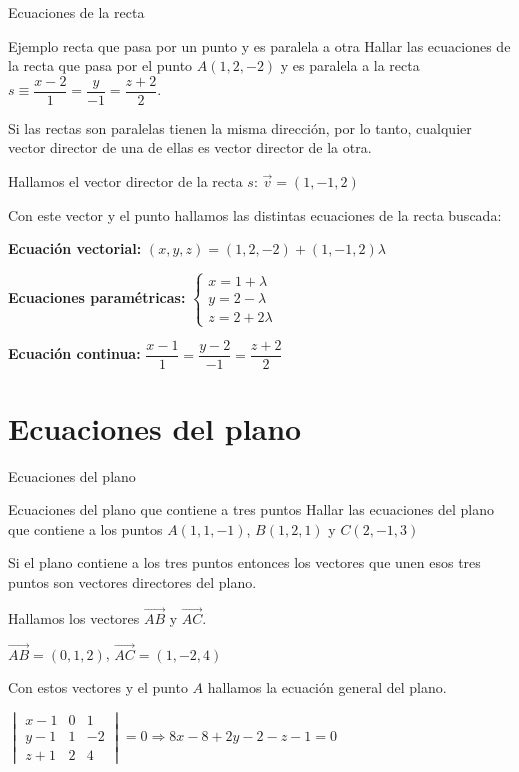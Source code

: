 \documentclass[8pt]{beamer}
\renewcommand{\vector}[1]{\overrightarrow{#1}}
\begin{document}
\begin{frame}[t]{Ecuaciones de la recta}
\begin{exampleblock}{Ejemplo recta que pasa por un punto y es paralela a otra}
Hallar las ecuaciones de la recta que pasa por el punto $A(1,2,-2)$ y es paralela a la recta $s \equiv  \dfrac{x-2}{1}=\dfrac{y}{-1}=\dfrac{z+2}{2}$. 
\end{exampleblock}

Si las rectas son paralelas tienen la misma dirección, por lo tanto, cualquier vector director de una de ellas es vector director de la otra.

Hallamos el vector director de la recta $s$: $\vec{v}=(1,-1,2)$

Con este vector y el punto hallamos las distintas ecuaciones de la recta buscada:

\textbf{\color{titleColor!70}Ecuación vectorial:}  $(x,y,z)=(1,2,-2)+(1,-1,2)\lambda$

\textbf{\color{titleColor!70}Ecuaciones paramétricas:} $\begin{cases} x=1+\lambda \\ y=2-\lambda \\ z= 2+2 \lambda\end{cases}$

\textbf{\color{titleColor!70}Ecuación continua:} $\dfrac{x-1}{1}=\dfrac{y-2}{-1}=\dfrac{z+2}{2}$ 

\end{frame}

\section{Ecuaciones del plano}

\begin{frame}[t]{Ecuaciones del plano}
\begin{exampleblock}{Ecuaciones del plano que contiene a tres puntos}
Hallar las ecuaciones del plano que contiene a los puntos $A(1,1,-1)$, $B(1,2,1)$ y $C(2,-1,3)$
\end{exampleblock}

Si el plano contiene a los tres puntos entonces los vectores que unen esos tres puntos son vectores directores del plano.

Hallamos los vectores  $\vector{AB}$ y  $\vector{AC}$. 

$\vector{AB}=(0,1,2)$, $\vector{AC}=(1,-2,4)$

Con estos vectores y el punto $A$ hallamos la ecuación general del plano.

$\begin{vmatrix}
x-1 & 0 & 1 \\ y-1 & 1 & -2 \\ z+1 & 2 & 4 
\end{vmatrix}=0 \Rightarrow 8x-8+2y-2-z-1=0$
\end{frame}
\end{document}
